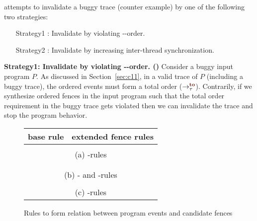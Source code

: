 \ourtechnique attempts to invalidate a buggy trace (\aka counter
example) by one of the following two strategies:
\begin{itemize}[label=strategy1,align=left,leftmargin=*]
	\item [Strategy1]:
		Invalidate by violating \sc-\lto-order.
	\item [Strategy2]:
		Invalidate by increasing inter-thread synchronization.
\end{itemize}

\noindent
{\bf Strategy1: Invalidate by violating \sc-\lto-order. 
	(\sfence)}\newline
Consider a buggy input program $P$.
%
As discussed in Section~\ref{sec:c11}, in a valid trace of $P$ 
(including a buggy trace), 
the \sc ordered events must form a total order ($\setTO$).
%
Contrarily, if we synthesize \sc ordered fences in the input program 
such that the total order requirement in the buggy trace gets violated 
then we can invalidate the trace and stop the program behavior.

\begin{figure}[t]
	\begin{tabular}{|c||c|c|c|}
		\multicolumn{1}{c}{base rule} & 
		\multicolumn{3}{c}{extended fence rules} \\\hline
		
		\resizebox{0.24\textwidth}{!}{} &
		\resizebox{0.24\textwidth}{!}{} &
		\resizebox{0.24\textwidth}{!}{} &
		\resizebox{0.24\textwidth}{!}{} \\
		\hline
		\multicolumn{4}{c}{(a) \lso-rules} \\
		\hline
		
		\resizebox{0.24\textwidth}{!}{} &
		\resizebox{0.24\textwidth}{!}{} &
		\resizebox{0.24\textwidth}{!}{} &
		\resizebox{0.24\textwidth}{!}{} \\
		
		\resizebox{0.24\textwidth}{!}{} &
		\resizebox{0.24\textwidth}{!}{} &&\\
		\hline
		\multicolumn{4}{c}{(b) \lsw- and \ldob-rules} \\
		\hline
		
		\resizebox{0.24\textwidth}{!}{} &
		\resizebox{0.24\textwidth}{!}{} & 
		\resizebox{0.24\textwidth}{!}{} &
		\resizebox{0.24\textwidth}{!}{} \\
		\hline
		\multicolumn{4}{c}{(c) \lws-rules} \\	
	\end{tabular}
	\caption{Rules to form relation between program events and 
		candidate fences}
	\label{fig:so rules}
\end{figure}


